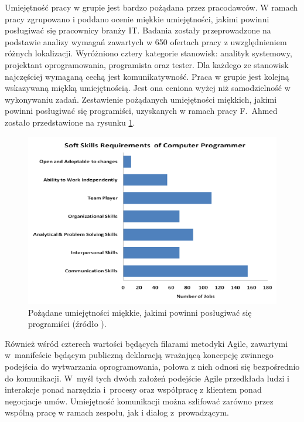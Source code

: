 Umiejętność pracy w grupie jest bardzo pożądana przez pracodawców.
W ramach pracy \cite{soft-skills} zgrupowano i poddano ocenie miękkie umiejętności, jakimi powinni posługiwać się pracownicy branży IT.
Badania zostały przeprowadzone na podstawie analizy wymagań zawartych w 650 ofertach pracy z uwzględnieniem różnych lokalizacji.
Wyróżniono cztery kategorie stanowisk: analityk systemowy, projektant oprogramowania, programista oraz tester.
Dla każdego ze stanowisk najczęściej wymaganą cechą jest komunikatywność.
Praca w grupie jest kolejną wskazywaną miękką umiejętnością.
Jest ona ceniona wyżej niż samodzielność w wykonywaniu zadań.
Zestawienie pożądanych umiejętności miękkich, jakimi powinni posługiwać się programiści, uzyskanych w ramach pracy F.~Ahmed zostało przedstawione na rysunku \ref{fig:soft-skills}.

\begin{figure}[h]
    \centering
    \includegraphics[width = 13cm]{chapter02/soft-skills.png}
    \caption{Pożądane umiejętności miękkie, jakimi powinni posługiwać się programiści (źródło \cite{soft-skills}).}
    \label{fig:soft-skills}
\end{figure}

Również wśród czterech wartości będących filarami metodyki Agile, zawartymi w~manifeście \cite{agile-manifesto} będącym publiczną deklaracją wrażającą koncepcję zwinnego podejścia do wytwarzania oprogramowania, połowa z nich odnosi się bezpośrednio do komunikacji.
W~myśl tych dwóch założeń podejście Agile przedkłada ludzi i interakcje ponad narzędzia i~procesy oraz współpracę z klientem ponad negocjacje umów.
Umiejętność komunikacji można szlifować zarówno przez wspólną pracę w ramach zespołu, jak i dialog z~prowadzącym.

